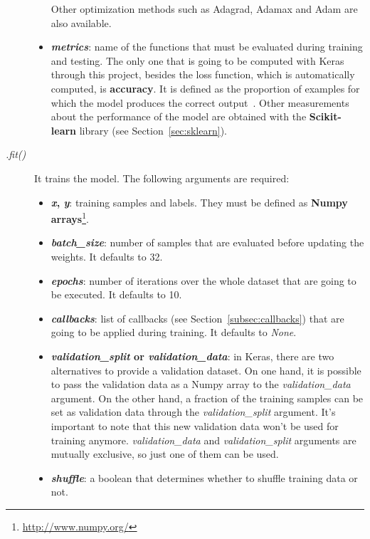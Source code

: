 \begin{description}
\begin{itemize}
		Other optimization methods such as Adagrad, Adamax and Adam are also available.
		
		\item \textbf{\textit{metrics}}: name of the functions that must be evaluated during training and testing. The only one that is going to be computed with Keras through this project, besides the loss function, which is automatically computed, is \textbf{accuracy}. It is defined as the proportion of examples for which the model produces the correct output~\cite{Goodfellow-et-al-2016}.			
		Other measurements about the performance of the model are obtained with the \textbf{Scikit-learn} library (see Section~\ref{sec:sklearn}).
	\end{itemize}
\end{description}

\begin{description}
	\item[\textit{.fit()}] It trains the model. The following arguments are required:
	\begin{itemize}
		\item \textbf{\textit{x}, \textit{y}}: training samples and labels. They must be defined as \textbf{Numpy arrays}\footnote{\url{http://www.numpy.org/}}.
		
		\item \textbf{\textit{batch\_size}}: number of samples that are evaluated before updating the weights. It defaults to 32.
		
		\item \textbf{\textit{epochs}}: number of iterations over the whole dataset that are going to be executed. It defaults to 10.
		
		\item \textbf{\textit{callbacks}}: list of callbacks (see Section~\ref{subsec:callbacks}) that are going to be applied during training. It defaults to \textit{None}.
		
		\item \textbf{\textit{validation\_split} or \textit{validation\_data}}: in Keras, there are two alternatives to provide a validation dataset. On one hand, it is possible to pass the validation data as a Numpy array to the \textit{validation\_data} argument. On the other hand, a fraction of the training samples can be set as validation data through the \textit{validation\_split} argument. It's important to note that this new validation data won't be used for training anymore. \textit{validation\_data} and  \textit{validation\_split} arguments are mutually exclusive, so just one of them can be used.
		
		\item \textbf{\textit{shuffle}}: a boolean that determines whether to shuffle training data or not. 
	\end{itemize}
\end{description}

